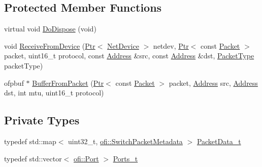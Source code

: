 \subsection*{Protected Member Functions}
\begin{DoxyCompactItemize}
\item 
virtual void \hyperlink{classns3_1_1OpenFlowSwitchNetDevice_a7507624a03f7c74b5b7989892fe11113}{Do\+Dispose} (void)
\item 
void \hyperlink{classns3_1_1OpenFlowSwitchNetDevice_a3f48603d679c0f7c1ffe43bf4140fce2}{Receive\+From\+Device} (\hyperlink{classns3_1_1Ptr}{Ptr}$<$ \hyperlink{classns3_1_1NetDevice}{Net\+Device} $>$ netdev, \hyperlink{classns3_1_1Ptr}{Ptr}$<$ const \hyperlink{classns3_1_1Packet}{Packet} $>$ packet, uint16\+\_\+t protocol, const \hyperlink{classns3_1_1Address}{Address} \&src, const \hyperlink{classns3_1_1Address}{Address} \&dst, \hyperlink{classns3_1_1NetDevice_ace65153f09144f55a0d3e702fc29d6b2}{Packet\+Type} packet\+Type)
\item 
ofpbuf $\ast$ \hyperlink{classns3_1_1OpenFlowSwitchNetDevice_a48ab0d1c8b3ae135f012ebe6b4d935a4}{Buffer\+From\+Packet} (\hyperlink{classns3_1_1Ptr}{Ptr}$<$ const \hyperlink{classns3_1_1Packet}{Packet} $>$ packet, \hyperlink{classns3_1_1Address}{Address} src, \hyperlink{classns3_1_1Address}{Address} dst, int mtu, uint16\+\_\+t protocol)
\end{DoxyCompactItemize}
\subsection*{Private Types}
\begin{DoxyCompactItemize}
\item 
typedef std\+::map$<$ uint32\+\_\+t, \hyperlink{structns3_1_1ofi_1_1SwitchPacketMetadata}{ofi\+::\+Switch\+Packet\+Metadata} $>$ \hyperlink{classns3_1_1OpenFlowSwitchNetDevice_aa060d5a2f51e59a59ca58bbc08c0d524}{Packet\+Data\+\_\+t}
\item 
typedef std\+::vector$<$ \hyperlink{structns3_1_1ofi_1_1Port}{ofi\+::\+Port} $>$ \hyperlink{classns3_1_1OpenFlowSwitchNetDevice_ae1b61b1f99b795b70b1bdf2f8d51d99e}{Ports\+\_\+t}
\end{DoxyCompactItemize}
